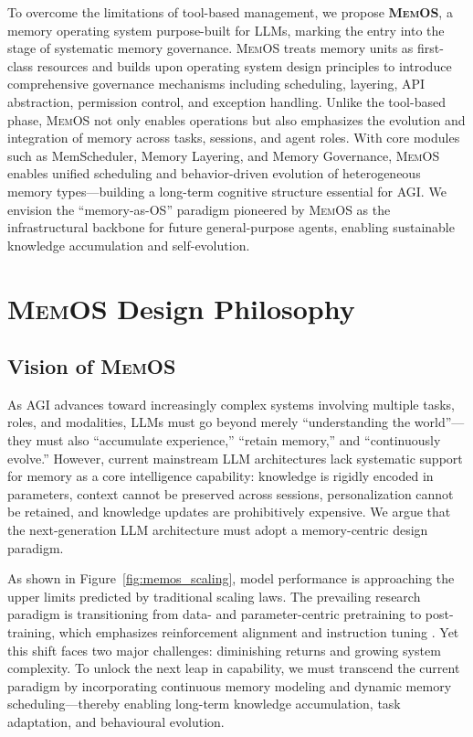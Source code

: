 \documentclass[]{memtensor}
\begin{document}
To overcome the limitations of tool-based management, we propose \textbf{\textsc{MemOS}}, a memory operating system purpose-built for LLMs, marking the entry into the stage of systematic memory governance.
\textsc{MemOS} treats memory units as first-class resources and builds upon operating system design principles to introduce comprehensive governance mechanisms including scheduling, layering, API abstraction, permission control, and exception handling.
Unlike the tool-based phase, \textsc{MemOS} not only enables operations but also emphasizes the evolution and integration of memory across tasks, sessions, and agent roles.
With core modules such as MemScheduler, Memory Layering, and Memory Governance, \textsc{MemOS} enables unified scheduling and behavior-driven evolution of heterogeneous memory types—building a long-term cognitive structure essential for AGI.
We envision the “memory-as-OS” paradigm pioneered by \textsc{MemOS} as the infrastructural backbone for future general-purpose agents, enabling sustainable knowledge accumulation and self-evolution.

\section{\textsc{MemOS} Design Philosophy}
\subsection{Vision of \textsc{MemOS}}

As AGI advances toward increasingly complex systems involving multiple tasks, roles, and modalities, LLMs must go beyond merely ``understanding the world''—they must also ``accumulate experience,'' ``retain memory,'' and ``continuously evolve.'' However, current mainstream LLM architectures lack systematic support for memory as a core intelligence capability: knowledge is rigidly encoded in parameters, context cannot be preserved across sessions, personalization cannot be retained, and knowledge updates are prohibitively expensive. We argue that the next-generation LLM architecture must adopt a memory-centric design paradigm.

As shown in Figure~\ref{fig:memos_scaling}, model performance is approaching the upper limits predicted by traditional scaling laws. The prevailing research paradigm is transitioning from data- and parameter-centric pretraining to post-training, which emphasizes reinforcement alignment and instruction tuning \cite{zhou_lima_arxiv23}. Yet this shift faces two major challenges: diminishing returns and growing system complexity. To unlock the next leap in capability, we must transcend the current paradigm by incorporating continuous memory modeling and dynamic memory scheduling—thereby enabling long-term knowledge accumulation, task adaptation, and behavioural evolution.
\end{document}
